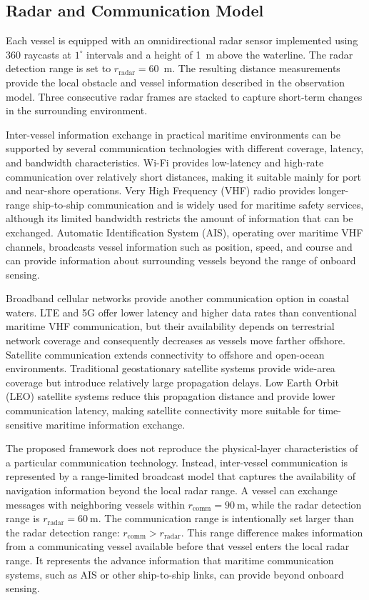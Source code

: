 \documentclass[final,5p,times,twocolumn]{elsarticle}
\begin{document}
\subsection{Radar and Communication Model}
{\color{violet}
Each vessel is equipped with an omnidirectional radar sensor implemented
using 360 raycasts at $1^\circ$ intervals and a height of 1~m above the
waterline. The radar detection range is set to
$r_{\mathrm{radar}}=60$~m. The resulting distance measurements provide
the local obstacle and vessel information described in the observation
model. Three consecutive radar frames are stacked to capture short-term
changes in the surrounding environment.

Inter-vessel information exchange in practical maritime environments can
be supported by several communication technologies with different
coverage, latency, and bandwidth characteristics. Wi-Fi provides
low-latency and high-rate communication over relatively short distances,
making it suitable mainly for port and near-shore operations. Very High
Frequency (VHF) radio provides longer-range ship-to-ship communication
and is widely used for maritime safety services, although its limited
bandwidth restricts the amount of information that can be exchanged.
Automatic Identification System (AIS), operating over maritime VHF
channels, broadcasts vessel information such as position, speed, and
course and can provide information about surrounding vessels beyond the
range of onboard sensing.

Broadband cellular networks provide another communication option in
coastal waters. LTE and 5G offer lower latency and higher data rates than
conventional maritime VHF communication, but their availability depends
on terrestrial network coverage and consequently decreases as vessels
move farther offshore. Satellite communication extends connectivity to
offshore and open-ocean environments. Traditional geostationary
satellite systems provide wide-area coverage but introduce relatively
large propagation delays. Low Earth Orbit (LEO) satellite systems reduce
this propagation distance and provide lower communication latency,
making satellite connectivity more suitable for time-sensitive maritime
information exchange.

The proposed framework does not reproduce the physical-layer
characteristics of a particular communication technology. Instead,
inter-vessel communication is represented by a range-limited broadcast
model that captures the availability of navigation information beyond
the local radar range. A vessel can exchange messages with neighboring
vessels within
$r_{\mathrm{comm}}=90~\mathrm{m}$,
while the radar detection range is
$r_{\mathrm{radar}}=60~\mathrm{m}$.
The communication range is intentionally set larger than the radar detection range: $r_{\mathrm{comm}}>r_{\mathrm{radar}}$. This range difference makes information from a communicating vessel available before that vessel enters the local radar range. It represents the advance information that maritime communication systems, such as AIS or other ship-to-ship links, can provide beyond onboard sensing.

}
\end{document}
